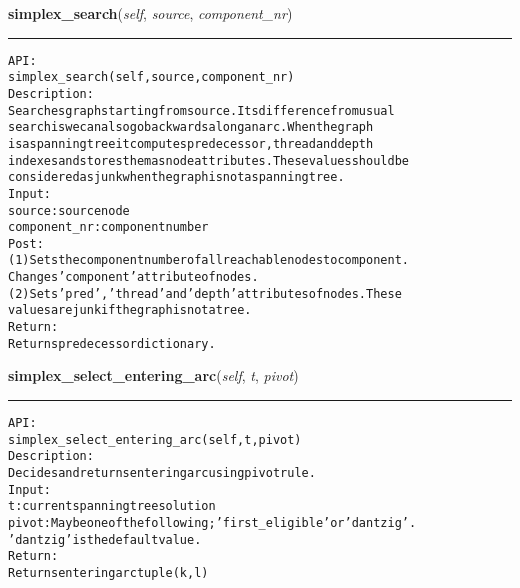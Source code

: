 \hspace{.8\funcindent}\begin{boxedminipage}{\funcwidth}

    \raggedright \textbf{simplex\_search}(\textit{self}, \textit{source}, \textit{component\_nr})

    \vspace{-1.5ex}

    \rule{\textwidth}{0.5\fboxrule}
\setlength{\parskip}{2ex}
\begin{alltt}

API:
    simplex\_search(self, source, component\_nr)
Description:
    Searches graph starting from source. Its difference from usual
    search is we can also go backwards along an arc. When the graph
    is a spanning tree it computes predecessor, thread and depth
    indexes and stores them as node attributes. These values should be
    considered as junk when the graph is not a spanning tree.
Input:
    source: source node
    component\_nr: component number
Post:
    (1) Sets the component number of all reachable nodes to component.
    Changes 'component' attribute of nodes.
    (2) Sets 'pred', 'thread' and 'depth' attributes of nodes. These
    values are junk if the graph is not a tree.
Return:
    Returns predecessor dictionary.
\end{alltt}

\setlength{\parskip}{1ex}
    \end{boxedminipage}

    \label{coinor:gimpy:graph:Graph:simplex_select_entering_arc}

    \vspace{0.5ex}

\hspace{.8\funcindent}\begin{boxedminipage}{\funcwidth}

    \raggedright \textbf{simplex\_select\_entering\_arc}(\textit{self}, \textit{t}, \textit{pivot})

    \vspace{-1.5ex}

    \rule{\textwidth}{0.5\fboxrule}
\setlength{\parskip}{2ex}
\begin{alltt}

API:
    simplex\_select\_entering\_arc(self, t, pivot)
Description:
    Decides and returns entering arc using pivot rule.
Input:
    t: current spanning tree solution
    pivot: May be one of the following; 'first\_eligible' or 'dantzig'.
    'dantzig' is the default value.
Return:
    Returns entering arc tuple (k,l)
\end{alltt}

\setlength{\parskip}{1ex}
    \end{boxedminipage}

